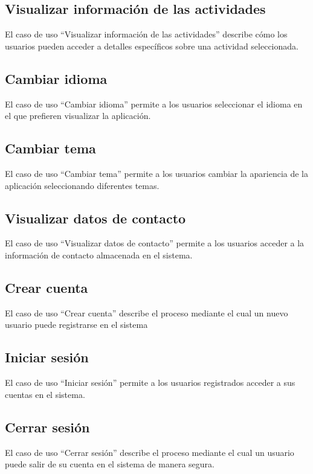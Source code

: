 \subsection{Visualizar información de las actividades}
El caso de uso “Visualizar información de las actividades” describe cómo los usuarios pueden acceder a detalles específicos sobre una actividad seleccionada.

\subsection{Cambiar idioma}
El caso de uso “Cambiar idioma” permite a los usuarios seleccionar el idioma en el que prefieren visualizar la aplicación.

\subsection{Cambiar tema}
El caso de uso “Cambiar tema” permite a los usuarios cambiar la apariencia de la aplicación seleccionando diferentes temas.

\subsection{Visualizar datos de contacto}
El caso de uso “Visualizar datos de contacto” permite a los usuarios acceder a la información de contacto almacenada en el sistema.

\subsection{Crear cuenta}
El caso de uso “Crear cuenta” describe el proceso mediante el cual un nuevo usuario puede registrarse en el sistema

\subsection{Iniciar sesión}
El caso de uso “Iniciar sesión” permite a los usuarios registrados acceder a sus cuentas en el sistema.

\subsection{Cerrar sesión}
El caso de uso “Cerrar sesión” describe el proceso mediante el cual un usuario puede salir de su cuenta en el sistema de manera segura.

